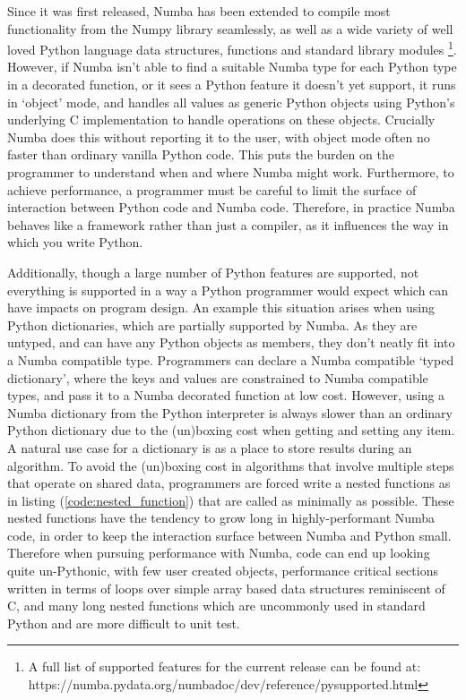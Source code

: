 \documentclass{IEEEcsmag}
\begin{document}
Since it was first released, Numba has been extended to compile most functionality from the Numpy library seamlessly, as well as a wide variety of well loved Python language data structures, functions and standard library modules \footnote{A full list of supported features for the current release can be found at: https://numba.pydata.org/numba\-doc/dev/reference/pysupported.html}. However, if Numba isn't able to find a suitable Numba type for each Python type in a decorated function, or it sees a Python feature it doesn't yet support, it runs in `object' mode, and handles all values as generic Python objects using Python's underlying C implementation to handle operations on these objects. Crucially Numba does this without reporting it to the user, with object mode often no faster than ordinary vanilla Python code. This puts the burden on the programmer to understand when and where Numba might work. Furthermore, to achieve performance, a programmer must be careful to limit the surface of interaction between Python code and Numba code. Therefore, in practice Numba behaves like a framework rather than just a compiler, as it influences the way in which you write Python.

Additionally, though a large number of Python features are supported, not everything is supported in a way a Python programmer would expect which can have impacts on program design. An example this situation arises when using Python dictionaries, which are partially supported by Numba. As they are untyped, and can have any Python objects as members, they don't neatly fit into a Numba compatible type. Programmers can declare a Numba compatible `typed dictionary', where the keys and values are constrained to Numba compatible types, and pass it to a Numba decorated function at low cost. However, using a Numba dictionary from the Python interpreter is always slower than an ordinary Python dictionary due to the (un)boxing cost when getting and setting any item. A natural use case for a dictionary is as a place to store results during an algorithm. To avoid the (un)boxing cost in algorithms that involve multiple steps that operate on shared data, programmers are forced write a nested functions as in listing (\ref{code:nested_function}) that are called as minimally as possible. These nested functions have the tendency to grow long in highly-performant Numba code, in order to keep the interaction surface between Numba and Python small. Therefore when pursuing performance with Numba, code can end up looking quite un-Pythonic, with few user created objects, performance critical sections written in terms of loops over simple array based data structures reminiscent of C, and many long nested functions which are uncommonly used in standard Python and are more difficult to unit test.
\end{document}
